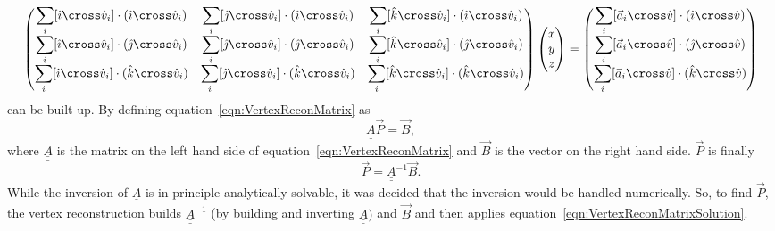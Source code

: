 \begin{equation}
  \begin{pmatrix}
    \displaystyle\sum_i [\hat{\imath} \cross \hat{v}_i] \cdot (\hat{\imath} \cross \hat{v}_i) & \displaystyle\sum_i [\hat{\jmath} \cross \hat{v}_i] \cdot (\hat{\imath} \cross \hat{v}_i) & \displaystyle\sum_i [\hat{k} \cross \hat{v}_i] \cdot (\hat{\imath} \cross \hat{v}_i) \\
    \displaystyle\sum_i [\hat{\imath} \cross \hat{v}_i] \cdot (\hat{\jmath} \cross \hat{v}_i) & \displaystyle\sum_i [\hat{\jmath} \cross \hat{v}_i] \cdot (\hat{\jmath} \cross \hat{v}_i) & \displaystyle\sum_i [\hat{k} \cross \hat{v}_i] \cdot (\hat{\jmath} \cross \hat{v}_i) \\ 
    \displaystyle\sum_i [\hat{\imath} \cross \hat{v}_i] \cdot (\hat{k} \cross \hat{v}_i) & \displaystyle\sum_i [\hat{\jmath} \cross \hat{v}_i] \cdot (\hat{k} \cross \hat{v}_i) & \displaystyle\sum_i [\hat{k} \cross \hat{v}_i] \cdot (\hat{k} \cross \hat{v}_i) 
  \end{pmatrix}
  \begin{pmatrix}
   x \\
   y \\
   z
  \end{pmatrix}
  =
  \begin{pmatrix}
    \displaystyle\sum_i [\vec{a}_i \cross \hat{v}] \cdot (\hat{\imath} \cross \hat{v}) \\
    \displaystyle\sum_i [\vec{a}_i \cross \hat{v}] \cdot (\hat{\jmath} \cross \hat{v}) \\
    \displaystyle\sum_i [\vec{a}_i \cross \hat{v}] \cdot (\hat{k} \cross \hat{v})
  \end{pmatrix}
  \label{eqn:VertexReconMatrix}
\end{equation}
can be built up.  By defining equation~\ref{eqn:VertexReconMatrix} as
\begin{equation}
  \underline{\underline{A}} \vec{P} = \vec{B},
  \label{eqn:VertexReconMatrixSimple}
\end{equation}
where $\underline{\underline{A}}$ is the matrix on the left hand side of equation~\ref{eqn:VertexReconMatrix} and $\vec{B}$ is the vector on the right hand side.  $\vec{P}$ is finally
\begin{equation}
  \vec{P} = \underline{\underline{A}}^{-1} \vec{B}.
  \label{eqn:VertexReconMatrixSolution}
\end{equation}
While the inversion of $\underline{\underline{A}}$ is in principle analytically solvable, it was decided that the inversion would be handled numerically.  So, to find $\vec{P}$, the vertex reconstruction builds $\underline{\underline{A}}^{-1}$ (by building and inverting $\underline{\underline{A}})$ and $\vec{B}$ and then applies equation~\ref{eqn:VertexReconMatrixSolution}.
\newline
\newline
